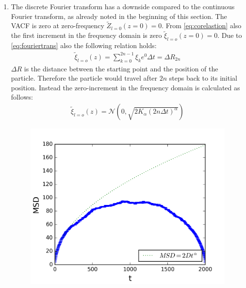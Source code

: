 \documentclass[
  a4paper,BCOR10mm,oneside,
  bibtotoc,idxtotoc,
  headsepline,footsepline,%
  fleqn,openbib
]{scrbook}
\begin{document}
\begin{enumerate}
 \item The discrete Fourier transform has a downside compared to the continuous Fourier transform, as already noted in the beginning of this section. The VACF is zero at zero-frequency $ \tilde{Z}_{l=0}(z=0)=0$.  From \cref{eq:corelastion} also the first increment in the frequency domain is zero $ \tilde{\xi}_{l=o}(z=0)= 0$. Due to \cref{eq:fouriertrans} also the following relation holds:
 \begin{align}
   \tilde{\xi}_{l=o}(z) = \sum_{k=0}^{2n-1} \xi_k e^{0} \Delta t = \Delta  R_{2n} \label{correction}
 \end{align}
$\Delta R $ is the distance between the starting point and the position of the particle. Therefore the particle would travel after $2n$ steps back to its initial position. Instead the zero-increment in the frequency domain is calculated as follows:
\begin{align}
 \tilde{\xi}_{l=o}(z) = \mathcal{N}(0,\sqrt{2 K_{\alpha} (2n \Delta t)^\alpha})
\end{align}
\begin{figure}
\centering
\begin{minipage}{.5\textwidth}
  \centering
  \includegraphics[width=\linewidth]{./data/nocorrectionmsd.png}
  \captionsetup{width=0.9\linewidth}
  \label{fig:6}
\end{minipage}%
\begin{minipage}{.5\textwidth}
  \centering

\end{minipage}
\end{figure}
\end{enumerate}
\end{document}
